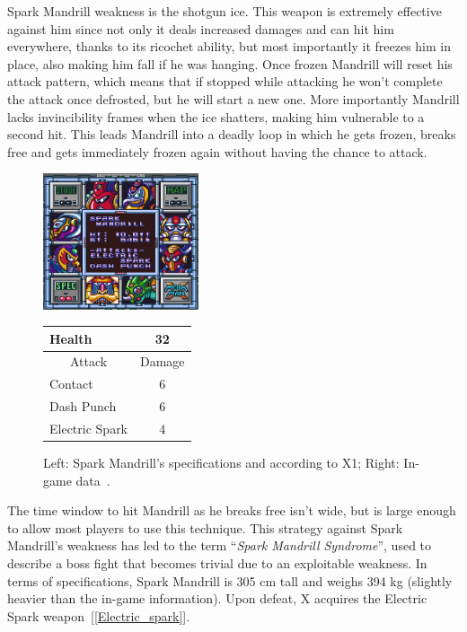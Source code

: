 Spark Mandrill weakness is the shotgun ice. This weapon is extremely effective against him since not only it deals increased damages and can hit him everywhere, thanks to its ricochet ability, but most importantly it freezes him in place, also making him fall if he was hanging. Once frozen Mandrill will reset his attack pattern, which means that if stopped while attacking he won't complete the attack once defrosted, but he will start a new one. More importantly Mandrill lacks invincibility frames when the ice shatters, making him vulnerable to a second hit. This leads Mandrill into a deadly loop in which he gets frozen, breaks free and gets immediately frozen again without having the chance to attack.\begin{figure}[htp]
	\begin{minipage}[c]{0.45\linewidth}
		\vspace{0pt}
		\centering
		\includegraphics[height=4cm]{figures/X1/Spark_mandrill/Spark_mandril_specs.png}
	\end{minipage}
	\begin{minipage}[c]{0.45\linewidth}
		\centering
		\vspace{0pt}
		\begin{tabular}[h]{l c}
			\toprule
			Health  & 32\\
			\midrule
			\multicolumn{1}{c}{Attack} & \multicolumn{1}{c}{Damage}\\
			Contact & 6\\
			Dash Punch& 6\\
			Electric Spark & 4\\
			\bottomrule
		\end{tabular}
	\end{minipage}
	\caption{Left: Spark Mandrill's specifications and according to X1; Right: In-game data~\cite{wiki:Spark_mandrill}. }
	\label{Mandrill_specs}
\end{figure}
 The time window to hit Mandrill as he breaks free isn't wide, but is large enough to allow most players to use this technique.  This strategy against Spark Mandrill's weakness has led to the term ``\textit{Spark Mandrill Syndrome}'', used to describe a boss fight that becomes trivial due to an exploitable weakness. In terms of specifications, Spark Mandrill is 305 cm tall and weighs 394 kg (slightly heavier than the in-game information). Upon defeat, X acquires the Electric Spark weapon~[\ref{Electric_spark}].


